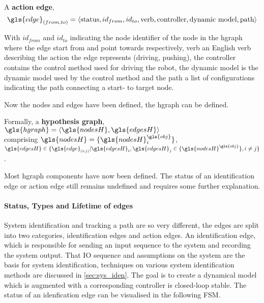 A \textbf{action edge}, \[\gls{edge}_{(from, to)} = \left\langle \textrm{status}, id_{from}, id_{to}, \textrm{verb}, \textrm{controller},\textrm{dynamic model}, \textrm{path}\right\rangle\]\bs

With $id_{from}$ and $id_{to}$ indicating the node identifier of the node in the \ac{hgraph} where the edge start from and point towards respectively, verb an English verb describing the action the edge represents (driving, pushing), the controller contains the control method used for driving the robot, the dynamic model is the dynamic model used by the control method and the path a list of configurations indicating the path connecting a start- to target node.\bs

Now the nodes and edges have been defined, the \ac{hgraph} can be defined.\bs

Formally, a \textbf{hypothesis graph}, $\gls{hgraph} = \left\langle \gls{nodesH}, \gls{edgesH} \right\rangle $
\\comprising $\gls{nodesH} = \{\gls{nodesH}^{\gls{obj}}_{i}\}$, \quad $\gls{edgesH} \in \{\gls{edge}_{(i,j)}| \gls{edgesH}_i, \gls{edgesH}_j \in \{\gls{nodesH}^{\gls{obj}} \}, i \neq j\}$.\bs

Most \ac{hgraph} components have now been defined. The status of an identification edge or action edge still remains undefined and requires some further explanation.\bs

\paragraph{Status, Types and Lifetime of edges}
System identification and tracking a path are so very different, the edges are split into two categories, identification edges and action edges. An identification edge, which is responsible for sending an input sequence to the system and recording the system output. That \ac{IO} sequence and assumptions on the system are the basis for system identification, techniques on various system identification methods are discussed in \cref{sec:sys_iden}. The goal is to create a dynamical model which is augmented with a corresponding controller is closed-loop stable. The status of an idenfication edge can be visualised in the following \ac{FSM}.\bs

